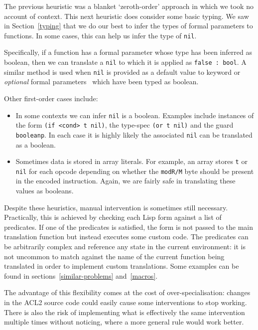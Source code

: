 \documentclass[a4paper,12pt,twoside,openright]{report}
\begin{document}
The previous heuristic was a blanket `zeroth-order' approach in which we took no account of context.  This next heuristic does consider some basic typing.  We saw in Section~\ref{typing} that we do our best to infer the types of formal parameters to functions.  In some cases, this can help us infer the type of \texttt{nil}.

Specifically, if a function has a formal parameter whose type has been inferred as boolean, then we can translate a \texttt{nil} to which it is applied as \texttt{false : bool}.  A similar method is used when \texttt{nil} is provided as a default value to keyword or \emph{optional} formal parameters~\cite{types-xargs} which have been typed as boolean.

Other first-order cases include:

\begin{itemize}
  \item In some contexts we can infer \texttt{nil} is a boolean.  Examples include instances of the form \texttt{(if <cond> t nil)}, the type-spec \texttt{(or t nil)} and the guard \texttt{booleanp}.  In each case it is highly likely the associated \texttt{nil} can be translated as a boolean.
  \item Sometimes data is stored in array literals.  For example, an array stores \texttt{t} or \texttt{nil} for each opcode depending on whether the \texttt{modR/M} byte should be present in the encoded instruction.  Again, we are fairly safe in translating these values as booleans.
\end{itemize}

Despite these heuristics, manual intervention is sometimes still necessary.  Practically, this is achieved by checking each Lisp form against a list of predicates.  If one of the predicates is satisfied, the form is not passed to the main translation function but instead executes some custom code.  The predicates can be arbitrarily complex and reference any state in the current environment: it is not uncommon to match against the name of the current function being translated in order to implement custom translations.  Some examples can be found in sections~\ref{similar-problems} and~\ref{macros}.

The advantage of this flexibility comes at the cost of over-specialisation: changes in the ACL2 source code could easily cause some interventions to stop working.  There is also the risk of implementing what is effectively the same intervention multiple times without noticing, where a more general rule would work better.
\end{document}
